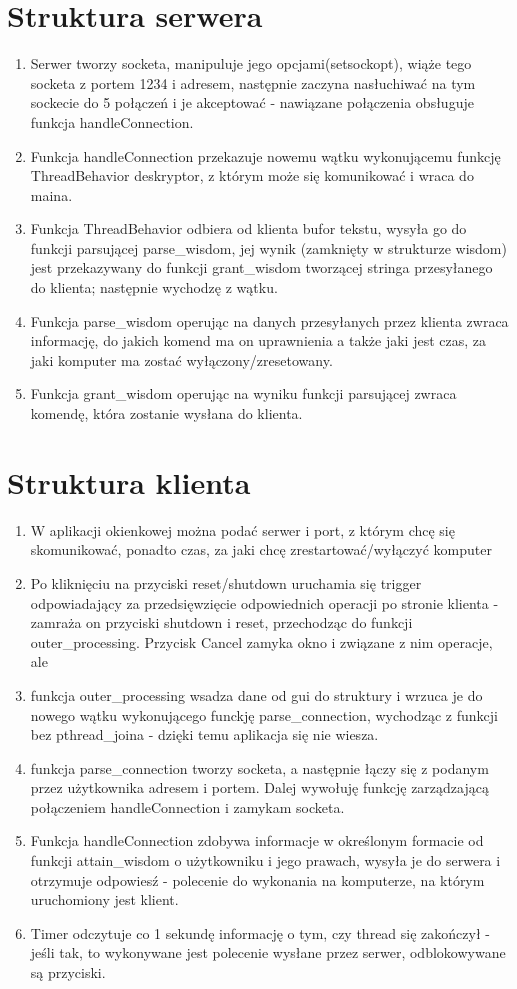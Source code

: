 \documentclass[12pt]{article}
\begin{document}
\section{Struktura serwera}
\begin {enumerate}
	\item Serwer tworzy socketa, manipuluje jego opcjami(setsockopt), wiąże tego socketa z portem 1234 i adresem, następnie zaczyna nasłuchiwać na tym sockecie do 5 połączeń i je akceptować - nawiązane połączenia obsługuje funkcja handleConnection.
	\item Funkcja handleConnection przekazuje nowemu wątku wykonującemu funkcję ThreadBehavior deskryptor, z którym może się komunikować i wraca do maina.
	\item Funkcja ThreadBehavior odbiera od klienta bufor tekstu, wysyła go do funkcji parsującej parse\_wisdom, jej wynik (zamknięty w strukturze wisdom) jest przekazywany do funkcji grant\_wisdom tworzącej stringa przesyłanego do klienta; następnie wychodzę z wątku.
	\item Funkcja parse\_wisdom operując na danych przesyłanych przez klienta zwraca informację, do jakich komend ma on uprawnienia a także jaki jest czas, za jaki komputer ma zostać wyłączony/zresetowany.
	\item Funkcja grant\_wisdom operując na wyniku funkcji parsującej zwraca komendę, która zostanie wysłana do klienta.

\end {enumerate}
\section{Struktura klienta}
\begin{enumerate}
	\item W aplikacji okienkowej można podać serwer i port, z którym chcę się skomunikować, ponadto czas, za jaki chcę zrestartować/wyłączyć komputer
	\item Po kliknięciu na przyciski reset/shutdown uruchamia się trigger odpowiadający za przedsięwzięcie odpowiednich operacji po stronie klienta - zamraża on przyciski shutdown i reset, przechodząc do funkcji outer\_processing. Przycisk Cancel zamyka okno i związane z nim operacje, ale 
	\item funkcja outer\_processing wsadza dane od gui do struktury i wrzuca je do nowego wątku wykonującego funckję parse\_connection, wychodząc z funkcji bez pthread\_joina - dzięki temu aplikacja się nie wiesza.
	\item funkcja parse\_connection tworzy socketa, a następnie łączy się z podanym przez użytkownika adresem i portem. Dalej wywołuję funkcję zarządzającą połączeniem handleConnection i zamykam socketa.
	\item Funkcja handleConnection zdobywa informacje w określonym formacie od funkcji attain\_wisdom o użytkowniku i jego prawach, wysyła je do serwera i otrzymuje odpowiesź - polecenie do wykonania na komputerze, na którym uruchomiony jest klient.
	\item Timer odczytuje co 1 sekundę informację o tym, czy thread się zakończył - jeśli tak, to wykonywane jest polecenie wysłane przez serwer, odblokowywane są przyciski.
\end{enumerate}
\end{document}
